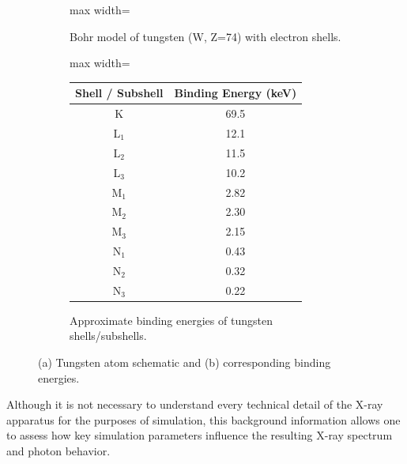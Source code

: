 \begin{figure}[H]
\begin{subfigure}[c]{0.45\linewidth}
\begin{adjustbox}{max width=\linewidth}
        \end{adjustbox}
        \caption{Bohr model of tungsten (W, Z=74) with electron shells.}
        \label{fig:tungsten_atomic_model_bohr}
    \end{subfigure}%
    \hfill
    \begin{subfigure}[c]{0.45\linewidth}   %
        \centering
        \begin{adjustbox}{max width=\linewidth}
        \begin{tabular}{cc}
            \toprule
            \textbf{Shell / Subshell} & \textbf{Binding Energy (keV)} \\
            \midrule
            K     & 69.5 \\
            L$_1$ & 12.1 \\
            L$_2$ & 11.5 \\
            L$_3$ & 10.2 \\
            M$_1$ & 2.82 \\
            M$_2$ & 2.30 \\
            M$_3$ & 2.15 \\
            N$_1$ & 0.43 \\
            N$_2$ & 0.32 \\
            N$_3$ & 0.22 \\
            \bottomrule
        \end{tabular}
        \end{adjustbox}
        \caption{Approximate binding energies of tungsten shells/subshells.}
        \label{tab:tungsten_binding_energies}
    \end{subfigure}

    \caption{(a) Tungsten atom schematic and (b) corresponding binding energies.}
    \label{fig:tungsten_combined}
\end{figure}


Although it is not necessary to understand every technical detail of the X-ray
apparatus for the purposes of simulation, this background information allows one
to assess how key simulation parameters influence the resulting X-ray spectrum
and photon behavior.

